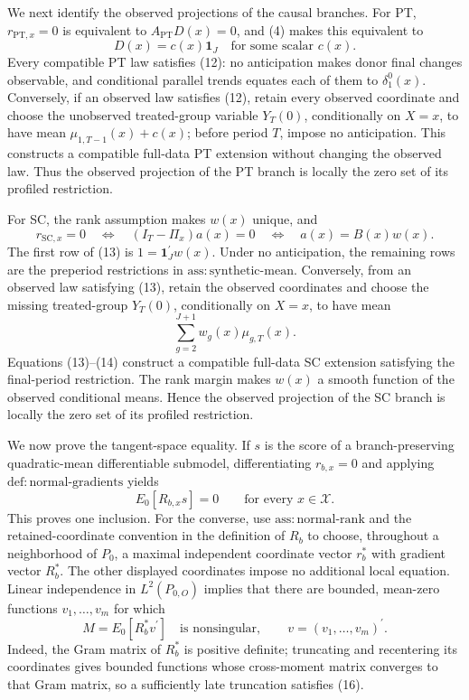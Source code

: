 We next identify the observed projections of the causal branches. For PT, \(r_{\mathrm{PT},x}=0\) is equivalent to \(A_{\mathrm{PT}}D(x)=0\), and (4) makes this equivalent to
\[
 D(x)=c(x)\mathbf 1_J
 \quad\text{for some scalar }c(x).
 \tag{12}
\]
Every compatible PT law satisfies (12): no anticipation makes donor final changes observable, and conditional parallel trends equates each of them to \(\delta_1^0(x)\). Conversely, if an observed law satisfies (12), retain every observed coordinate and choose the unobserved treated-group variable \(Y_T(0)\), conditionally on \(X=x\), to have mean \(\mu_{1,T-1}(x)+c(x)\); before period \(T\), impose no anticipation. This constructs a compatible full-data PT extension without changing the observed law. Thus the observed projection of the PT branch is locally the zero set of its profiled restriction.

For SC, the rank assumption makes \(w(x)\) unique, and
\[
 r_{\mathrm{SC},x}=0
 \quad\Longleftrightarrow\quad
 (I_T-\Pi_x)a(x)=0
 \quad\Longleftrightarrow\quad
 a(x)=B(x)w(x).
 \tag{13}
\]
The first row of (13) is \(1=\mathbf 1_J^{\prime}w(x)\). Under no anticipation, the remaining rows are the preperiod restrictions in \(\mathrm{ass{:}synthetic\text{-}mean}\). Conversely, from an observed law satisfying (13), retain the observed coordinates and choose the missing treated-group \(Y_T(0)\), conditionally on \(X=x\), to have mean
\[
 \sum_{g=2}^{J+1}w_g(x)\mu_{g,T}(x).
 \tag{14}
\]
Equations (13)--(14) construct a compatible full-data SC extension satisfying the final-period restriction. The rank margin makes \(w(x)\) a smooth function of the observed conditional means. Hence the observed projection of the SC branch is locally the zero set of its profiled restriction.

We now prove the tangent-space equality. If \(s\) is the score of a branch-preserving quadratic-mean differentiable submodel, differentiating \(r_{b,x}=0\) and applying \(\mathrm{def{:}normal\text{-}gradients}\) yields
\[
 E_0[R_{b,x}s]=0
 \qquad\text{for every }x\in\mathcal X.
 \tag{15}
\]
This proves one inclusion. For the converse, use \(\mathrm{ass{:}normal\text{-}rank}\) and the retained-coordinate convention in the definition of \(R_b\) to choose, throughout a neighborhood of \(P_0\), a maximal independent coordinate vector \(r_b^{\ast}\) with gradient vector \(R_b^{\ast}\). The other displayed coordinates impose no additional local equation. Linear independence in \(L^2(P_{0,O})\) implies that there are bounded, mean-zero functions \(v_1,\ldots,v_m\) for which
\[
 M=E_0[R_b^{\ast}v^{\prime}]
 \quad\text{is nonsingular},
 \qquad v=(v_1,\ldots,v_m)^{\prime}.
 \tag{16}
\]
Indeed, the Gram matrix of \(R_b^{\ast}\) is positive definite; truncating and recentering its coordinates gives bounded functions whose cross-moment matrix converges to that Gram matrix, so a sufficiently late truncation satisfies (16).

